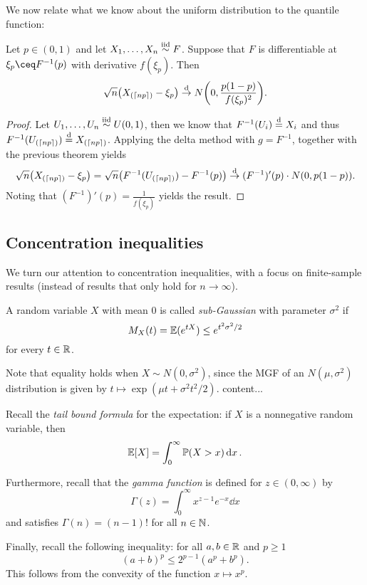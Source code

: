 We now relate what we know about the uniform distribution to the  quantile function: 
\begin{theorem}
    Let $p \in (0, 1)$ and let $X_1, \dotsc, X_n \overset{\mathrm{iid}}{\sim} F$. Suppose that $F$ is differentiable at $\xi_p \ceq F^{-1}(p)$ with derivative $f(\xi_p)$. Then
    \[
    \sqrt n \qty(X_{(\lceil np\rceil)} - \xi_p) \overset{\mathrm{d}}{\to} N\qty(0, \frac{p(1-p)}{f(\xi_p)^2}).
    \]
\end{theorem}

\begin{proof}
    Let $U_1, \dotsc, U_n \overset{\mathrm{iid}}{\sim} U(0, 1)$, then we know that $F^{-1}(U_i) \overset{\mathrm{d}}= X_i$ and thus $F^{-1} (U_{(\lceil np\rceil)}) \overset{\mathrm{d}}= X_{(\lceil np\rceil)}$. Applying the delta method with $g = F^{-1}$, together with the previous theorem yields
    \[
    \sqrt n \qty(X_{(\lceil np\rceil)} - \xi_p) = \sqrt n \qty(F^{-1}(U_{(\lceil np\rceil)}) - F^{-1}(p)) \overset{\mathrm{d}}{\to} (F^{-1})'(p) \cdot  N(0, p(1-p)).
    \]
    Noting that $(F^{-1})'(p) = \frac1{f(\xi_p)}$ yields the result. 
\end{proof}

\subsection{Concentration inequalities}
We turn our attention to concentration inequalities, with a focus on finite-sample results (instead of results that only hold for $n \to\infty$). 
\begin{definition}
    A random variable $X$ with mean 0 is called \emph{sub-Gaussian} with parameter $\sigma^2$ if
    \[
    M_X(t) = \mathbb E(e^{tX}) \leq e^{t^2\sigma^2/2}
    \]
    for every $t \in \mathbb R$. 
\end{definition}
\begin{remark}
Note that equality holds when $X \sim N(0, \sigma^2)$, since the MGF of an $N(\mu, \sigma^2)$ distribution is given by $t \mapsto \exp(\mu t + \sigma^2 t^2 /2)$. 
	content...
\end{remark}

\begin{recap}
	Recall the \emph{tail bound formula} for the expectation: if $X$ is a nonnegative random variable, then 
	\[
	\mathbb E[X] = \int_0^\infty \mathbb P(X > x) \dd{x}. 
	\]
	
	Furthermore, recall that the \emph{gamma function} is defined for $z \in (0, \infty)$ by
	\[
	\Gamma(z) = \int_0^\infty x^{z-1} e^{-x} \dd{x}
	\]
	and satisfies $\Gamma(n) = (n-1)!$ for all $n \in \mathbb N$. 
	
	Finally, recall the following inequality: for all $a, b \in \mathbb R$ and $p \geq 1$
	\[
	(a+b)^p \leq 2^{p-1} (a^p + b^p). 
	\]
	This follows from the convexity of the function $x \mapsto x^p$. 
\end{recap}

